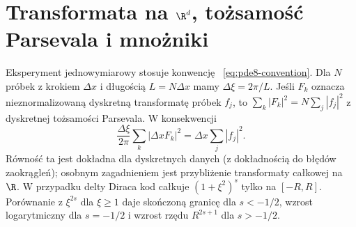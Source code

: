 \section[Transformata, Parseval i mnożniki]{Transformata na $\R^d$, tożsamość Parsevala i mnożniki}
Eksperyment jednowymiarowy stosuje konwencję
~\eqref{eq:pde8-convention}. Dla $N$ próbek z krokiem
$\Delta x$ i długością $L=N\Delta x$ mamy
$\Delta\xi=2\pi/L$. Jeśli $F_k$ oznacza nieznormalizowaną
dyskretną transformatę próbek $f_j$, to
$\sum_k|F_k|^2=N\sum_j|f_j|^2$ z dyskretnej
tożsamości Parsevala. W konsekwencji
\[
 \frac{\Delta\xi}{2\pi}\sum_k|\Delta x F_k|^2
 =\Delta x\sum_j|f_j|^2.
\]
Równość ta jest dokładna dla dyskretnych danych
(z dokładnością do błędów zaokrągleń); osobnym
zagadnieniem jest przybliżenie transformaty całkowej
na $\R$. W przypadku delty Diraca kod całkuje
$(1+\xi^2)^s$ tylko na $[-R,R]$. Porównanie z
$\xi^{2s}$ dla $\xi\ge1$ daje skończoną granicę
dla $s<-1/2$, wzrost logarytmiczny dla $s=-1/2$
i wzrost rzędu $R^{2s+1}$ dla $s>-1/2$.
